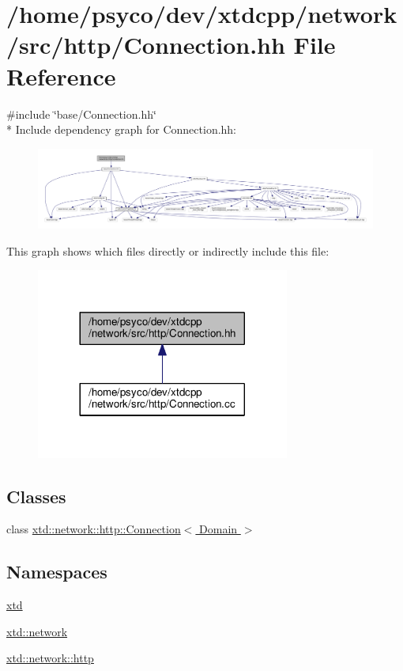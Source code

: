 \hypertarget{http_2Connection_8hh}{}\section{/home/psyco/dev/xtdcpp/network/src/http/\+Connection.hh File Reference}
\label{http_2Connection_8hh}
{\ttfamily \#include \char`\"{}base/\+Connection.\+hh\char`\"{}}\\*
Include dependency graph for Connection.\+hh\+:
\nopagebreak
\begin{figure}[H]
\begin{center}
\leavevmode
\includegraphics[width=350pt]{http_2Connection_8hh__incl}
\end{center}
\end{figure}
This graph shows which files directly or indirectly include this file\+:
\nopagebreak
\begin{figure}[H]
\begin{center}
\leavevmode
\includegraphics[width=236pt]{http_2Connection_8hh__dep__incl}
\end{center}
\end{figure}
\subsection*{Classes}
\begin{DoxyCompactItemize}
\item 
class \hyperlink{classxtd_1_1network_1_1http_1_1Connection}{xtd\+::network\+::http\+::\+Connection$<$ Domain $>$}
\end{DoxyCompactItemize}
\subsection*{Namespaces}
\begin{DoxyCompactItemize}
\item 
 \hyperlink{namespacextd}{xtd}
\item 
 \hyperlink{namespacextd_1_1network}{xtd\+::network}
\item 
 \hyperlink{namespacextd_1_1network_1_1http}{xtd\+::network\+::http}
\end{DoxyCompactItemize}
